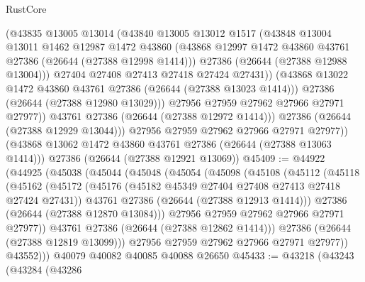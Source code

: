 \begin{lexlean}{RustCore}
\begin{coremodule}
                  (@43835
                    @13005
                    @13014
                    (@43840
                      @13005
                      @13012
                      @1517
                      (@43848
                        @13004
                        @13011
                        @1462
                        @12987
                        @1472
                        @43860
                        (@43868 @12997 @1472 @43860 @43761 @27386 (@26644 (@27388 @12998 @1414)))
                        @27386
                        (@26644 (@27388 @12988 @13004)))
                      @27404
                      @27408
                      @27413
                      @27418
                      @27424
                      @27431))
                  (@43868 @13022 @1472 @43860 @43761 @27386 (@26644 (@27388 @13023 @1414)))
                  @27386
                  (@26644 (@27388 @12980 @13029)))
                @27956
                @27959
                @27962
                @27966
                @27971
                @27977))
            @43761
            @27386
            (@26644 (@27388 @12972 @1414)))
          @27386
          (@26644 (@27388 @12929 @13044)))
        @27956
        @27959
        @27962
        @27966
        @27971
        @27977))
    (@43868 @13062 @1472 @43860 @43761 @27386 (@26644 (@27388 @13063 @1414)))
    @27386
    (@26644 (@27388 @12921 @13069))
@45409 := @44922
    (@44925
      (@45038
        (@45044
          (@45048
            (@45054
              (@45098
                (@45108
                  (@45112
                    (@45118
                      (@45162
                        (@45172
                          (@45176 (@45182 @45349 @27404 @27408 @27413 @27418 @27424 @27431))
                          @43761
                          @27386
                          (@26644 (@27388 @12913 @1414)))
                        @27386
                        (@26644 (@27388 @12870 @13084)))
                      @27956
                      @27959
                      @27962
                      @27966
                      @27971
                      @27977))
                  @43761
                  @27386
                  (@26644 (@27388 @12862 @1414)))
                @27386
                (@26644 (@27388 @12819 @13099)))
              @27956
              @27959
              @27962
              @27966
              @27971
              @27977))
          @43552)))
    @40079
    @40082
    @40085
    @40088
    @26650
@45433 := @43218
    (@43243
      (@43284
        (@43286

\end{coremodule}
\end{lexlean}
